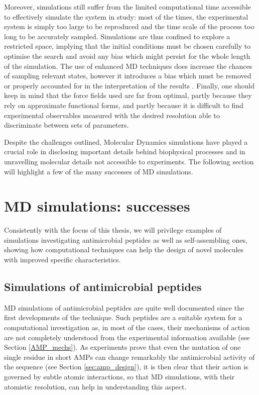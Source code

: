 Moreover, simulations still suffer from the limited computational time accessible to effectively simulate the system in study: most of the times, the experimental system is simply too large to be reproduced and the time scale of the process too long to be accurately sampled. Simulations are thus confined to explore a restricted space, implying that the initial conditions must be chosen carefully to optimise the search and avoid any bias which might persist for the whole length of the simulation. The use of enhanced MD techniques does increase the chances of sampling relevant states, however it introduces a bias which must be removed or properly accounted for in the interpretation of the results \cite{Bernardi2015,Best2005,Barducci2010,Barducci2011,Mills2008}.
Finally, one should keep in mind that the force fields used are far from optimal, partly because they rely on approximate functional forms, and partly because it is difficult to find experimental observables measured with the desired resolution able to discriminate between sets of parameters.

Despite the challenges outlined, Molecular Dynamics simulations have played a crucial role in disclosing important details behind biophysical processes and in unravelling molecular details not accessible to experiments. The following section will highlight a few of the many successes of MD simulations.


\section{MD simulations: successes} \label{sec:md_lit}
Consistently with the focus of this thesis, we will privilege examples of simulations investigating antimicrobial peptides as well as self-assembling ones, showing how computational techniques can help the design of novel molecules with improved specific characteristics.

\subsection{Simulations of antimicrobial peptides}
MD simulations of antimicrobial peptides are quite well documented since the first developments of the technique. Such peptides are a suitable system for a computational investigation as, in most of the cases, their mechanisms of action are not completely understood from the experimental information available (see Section \ref{AMP_mechs}). As experiments prove that even the mutation of one single residue in short AMPs can change remarkably the antimicrobial activity of the sequence (see Section \ref{sec:amp_design}), it is then clear that their action is governed by subtle atomic interactions, so that MD simulations, with their atomistic resolution, can help in understanding this aspect.

